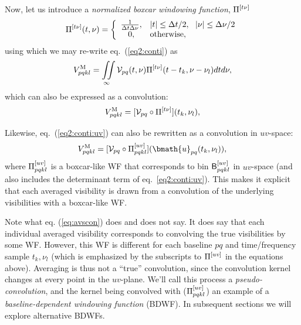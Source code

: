 \documentclass[useAMS,usenatbib]{mn2e}
\begin{document}
Now, let us introduce a \emph{normalized boxcar windowing function}, $\Pi^{[t\nu]}$ 
\begin{equation}
\Pi^{[t\nu]}(t,\nu) = \bigg \{ \begin{array}{cl}
\frac{1}{\Delta t\Delta\nu}, &  |t|\leq\Delta t/2,~~|\nu|\leq\Delta\nu/2 \\
0, & \mathrm{otherwise},
\end{array}
\end{equation}
using which we may re-write eq.~(\ref{eq2:conti}) as
\begin{equation}
V^\mathrm{M}_{pqkl} =  
\iint\limits_{\infty}
\mathcal{V}_{pq}(t,\nu) \Pi^{[t\nu]}(t-t_k,\nu-\nu_l) dtd\nu,
\end{equation}
which can also be expressed as a convolution:
\begin{equation}
V^\mathrm{M}_{pqkl} = [ \mathcal{V}_{pq} \circ \Pi^{[t\nu]} ](t_k,\nu_l),
\end{equation}

Likewise, eq.~(\ref{eq2:conti:uv}) can also be rewritten as a convolution in $uv$-space:
\begin{equation}
\Vm_{pqkl} = [ \VV_{pq} \circ \Puv_{pqkl} ](\bmath{u}_{pq}(t_k,\nu_l)),
\label{eq:avscon}
\end{equation}
where $\Pi^{[uv]}_{pqkl}$ is a boxcar-like WF that corresponds to bin $\mathsf{B}^{[uv]}_{pqkl}$ in $uv$-space 
(and also includes the determinant term of eq.~\ref{eq2:conti:uv}). This makes it explicit that each averaged 
visibility is drawn from a convolution of the underlying visibilities with a boxcar-like WF.

Note what eq. (\ref{eq:avscon}) does and does not say. It does say that each individual averaged visibility corresponds to 
convolving the true visibilities by some WF. However, this WF is different for each baseline $pq$ and 
time/frequency sample $t_k,\nu_l$ (which is emphasized by the subscripts to $\Pi^{[uv]}$ in the equations above). Averaging 
is thus not a ``true'' convolution, since the convolution kernel changes at every point in the $uv$-plane. We'll call this 
process a \emph{pseudo-convolution}, and the kernel being convolved with ($\Pi^{[uv]}_{pqkl}$) an example of a 
\emph{baseline-dependent windowing function} (BDWF). In subsequent sections we will explore alternative BDWFs.
\end{document}
